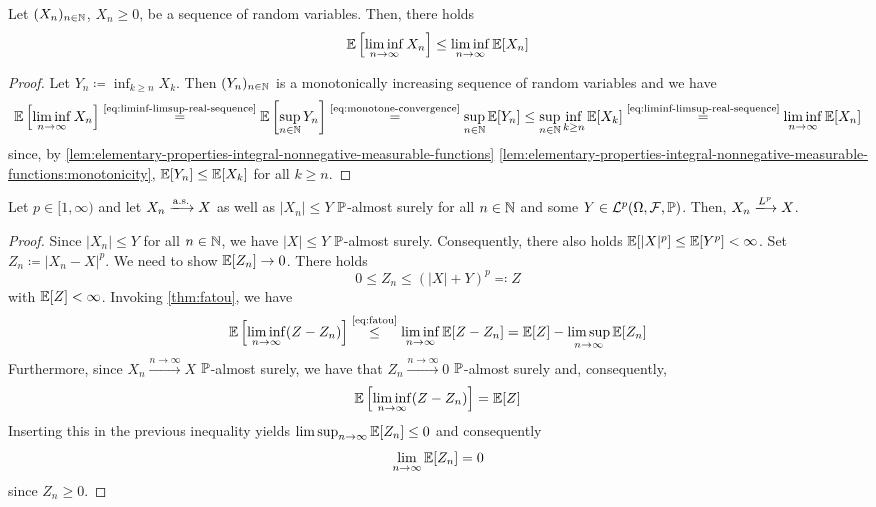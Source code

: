 \begin{theorem}\label{thm:fatou}
Let $(X_n)_{n \in \mathbb{N}}$, $X_n \geq 0$, be a sequence of random variables.
Then, there holds
\begin{equation}\label{eq:fatou}
\operatorname{\mathbb{E}}\left[\liminf_{n \to \infty} X_n\right]
\leq
\liminf_{n \to \infty}\operatorname{\mathbb{E}}[X_n]
\qedhere
\end{equation}
\end{theorem}
\begin{proof}
Let
\(
Y_n
\coloneq
\inf_{k \geq n}X_k
\).
Then $(Y_n)_{n \in \mathbb{N}}$ is a monotonically increasing sequence of random variables and we have
\[
\operatorname{\mathbb{E}}\left[\liminf_{n \to \infty}X_n\right]
\overset{\text{\eqref{eq:liminf-limsup-real-sequence}}}{=}
\operatorname{\mathbb{E}}\left[\sup_{n \in \mathbb{N}}Y_n\right]
\overset{\text{\eqref{eq:monotone-convergence}}}{=}
\sup_{n \in \mathbb{N}}\operatorname{\mathbb{E}}[Y_n]
\leq
\sup_{n \in \mathbb{N}}\inf_{k \geq n}\operatorname{\mathbb{E}}[X_k]
\overset{\text{\eqref{eq:liminf-limsup-real-sequence}}}{=}
\liminf_{n \to \infty}\operatorname{\mathbb{E}}[X_n]
\]
since,
by \autoref{lem:elementary-properties-integral-nonnegative-measurable-functions} \ref{lem:elementary-properties-integral-nonnegative-measurable-functions:monotonicity},
$\operatorname{\mathbb{E}}[Y_n] \leq \operatorname{\mathbb{E}}[X_k]$ for all $k \geq n$.
\end{proof}


\begin{theorem}\label{thm:dominated-convergence}
Let $p \in [1,\infty)$ and let
\(X_n \xlongrightarrow{\text{a.s.}} X\)
as well as $|X_n| \leq Y$ $\mathbb{P}$-almost surely for all $n \in \mathbb{N}$ and some $Y \in \mathcal{L}^p(\Omega,\mathcal{F},\mathbb{P})$.
Then, 
\(
\smash[t]{X_n \xlongrightarrow{L^p} X}
\).
\end{theorem}
\begin{proof}
Since $|X_n| \leq Y$ 
for all $n \in \mathbb{N}$,
we have $|X| \leq Y$ $\mathbb{P}$-almost surely.
Consequently, there also holds 
$\operatorname{\mathbb{E}}[|X|^p]
\leq
\operatorname{\mathbb{E}}[Y^p]
<\infty$.
Set
\(
Z_n
\coloneq
|X_n-X|^p
\).
We need to show 
$\operatorname{\mathbb{E}}[Z_n] 
\to 0$.
There holds
\[
0 \leq Z_n \leq (|X|+Y)^p \eqqcolon Z
\]
with $\operatorname{\mathbb{E}}[Z]<\infty$.
Invoking \autoref{thm:fatou}, we have
\[
\Exp\left[\liminf_{n \to \infty}(Z-Z_n)\right]
\overset{\text{\eqref{eq:fatou}}}{\leq}
\liminf_{n \to \infty}\Exp[Z-Z_n]
= %
\Exp[Z]-\limsup_{n \to \infty}\Exp[Z_n]
\]
Furthermore, since
\(
X_n
\xrightarrow{n \to \infty}
X
\)
$\mathbb{P}$-almost surely, we have that
\(
Z_n
\xrightarrow{n \to \infty}
0
\)
$\mathbb{P}$-almost surely and, consequently,
\[
\operatorname{\mathbb{E}}\left[\liminf_{n \to \infty}(Z-Z_n)\right]
=
\operatorname{\mathbb{E}}[Z]
\]
Inserting this in the previous inequality yields
\(
\limsup_{n \to \infty}\operatorname{\mathbb{E}}[Z_n]
\leq
0
\)
and consequently
\[
\lim_{n \to \infty}\operatorname{\mathbb{E}}[Z_n]
=
0
\]
since $Z_n \geq 0$.
\end{proof}




